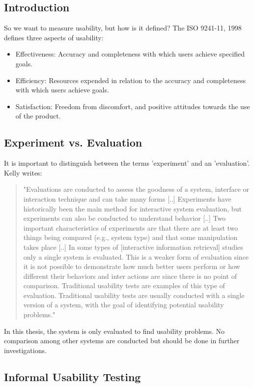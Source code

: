 \documentclass[11pt]{report}
\begin{document}
\subsection{Introduction}

So we want to measure usability, but how is it defined? The ISO 9241-11, 1998 \cite{ISO} defines three aspects of usability:
\begin{itemize}
	\item Effectiveness: Accuracy and completeness with which users achieve specified goals.
	\item Efficiency: Resources expended in relation to the accuracy and completeness with which users achieve goals.
	\item Satisfaction: Freedom from discomfort, and positive attitudes towards the use of the product.
\end{itemize}

\subsection{Experiment vs. Evaluation}

It is important to distinguish between the terms 'experiment' and an 'evaluation'. Kelly \cite{Kelly2007} writes:
\begin{quote}
"Evaluations are conducted to assess the goodness of a system, interface or interaction technique and can take many forms [..] Experiments have historically been the main method for interactive system evaluation, but experiments can also be conducted to understand behavior [..] Two important characteristics of experiments are that there are at least two things being compared (e.g., system type) and that some manipulation takes place [..] In some types of [interactive information retrieval] studies only a single system is evaluated. This is a weaker form of evaluation since it is not possible to demonstrate how much better users perform or how different their behaviors and inter actions are since there is no point of comparison. Traditional usability tests are examples of this type of evaluation. Traditional usability tests are usually conducted with a single version of a system, with the goal of identifying potential usability problems."	
\end{quote}

In this thesis, the system is only evaluated to find usability problems. No comparison among other systems are conducted but should be done in further investigations.

\subsection{Informal Usability Testing}
\end{document}
